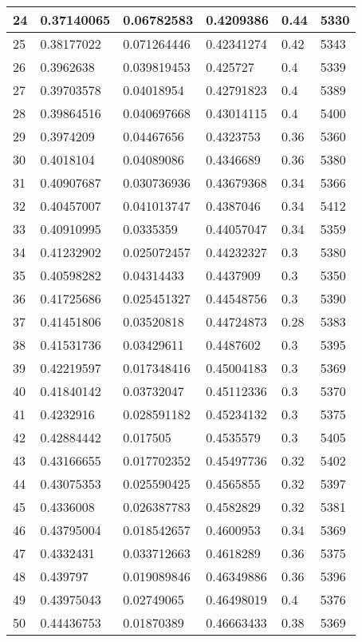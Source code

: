 \begin{longtable}{|l|l|l|l|l|l|}
24 & 0.37140065 & 0.06782583 & 0.4209386 & 0.44 & 5330 \\ \hline 
25 & 0.38177022 & 0.071264446 & 0.42341274 & 0.42 & 5343 \\ \hline 
26 & 0.3962638 & 0.039819453 & 0.425727 & 0.4 & 5339 \\ \hline 
27 & 0.39703578 & 0.04018954 & 0.42791823 & 0.4 & 5389 \\ \hline 
28 & 0.39864516 & 0.040697668 & 0.43014115 & 0.4 & 5400 \\ \hline 
29 & 0.3974209 & 0.04467656 & 0.4323753 & 0.36 & 5360 \\ \hline 
30 & 0.4018104 & 0.04089086 & 0.4346689 & 0.36 & 5380 \\ \hline 
31 & 0.40907687 & 0.030736936 & 0.43679368 & 0.34 & 5366 \\ \hline 
32 & 0.40457007 & 0.041013747 & 0.4387046 & 0.34 & 5412 \\ \hline 
33 & 0.40910995 & 0.0335359 & 0.44057047 & 0.34 & 5359 \\ \hline 
34 & 0.41232902 & 0.025072457 & 0.44232327 & 0.3 & 5380 \\ \hline 
35 & 0.40598282 & 0.04314433 & 0.4437909 & 0.3 & 5350 \\ \hline 
36 & 0.41725686 & 0.025451327 & 0.44548756 & 0.3 & 5390 \\ \hline 
37 & 0.41451806 & 0.03520818 & 0.44724873 & 0.28 & 5383 \\ \hline 
38 & 0.41531736 & 0.03429611 & 0.4487602 & 0.3 & 5395 \\ \hline 
39 & 0.42219597 & 0.017348416 & 0.45004183 & 0.3 & 5369 \\ \hline 
40 & 0.41840142 & 0.03732047 & 0.45112336 & 0.3 & 5370 \\ \hline 
41 & 0.4232916 & 0.028591182 & 0.45234132 & 0.3 & 5375 \\ \hline 
42 & 0.42884442 & 0.017505 & 0.4535579 & 0.3 & 5405 \\ \hline 
43 & 0.43166655 & 0.017702352 & 0.45497736 & 0.32 & 5402 \\ \hline 
44 & 0.43075353 & 0.025590425 & 0.4565855 & 0.32 & 5397 \\ \hline 
45 & 0.4336008 & 0.026387783 & 0.4582829 & 0.32 & 5381 \\ \hline 
46 & 0.43795004 & 0.018542657 & 0.4600953 & 0.34 & 5369 \\ \hline 
47 & 0.4332431 & 0.033712663 & 0.4618289 & 0.36 & 5375 \\ \hline 
48 & 0.439797 & 0.019089846 & 0.46349886 & 0.36 & 5396 \\ \hline 
49 & 0.43975043 & 0.02749065 & 0.46498019 & 0.4 & 5376 \\ \hline 
50 & 0.44436753 & 0.01870389 & 0.46663433 & 0.38 & 5369 \\ \hline 
\end{longtable}
